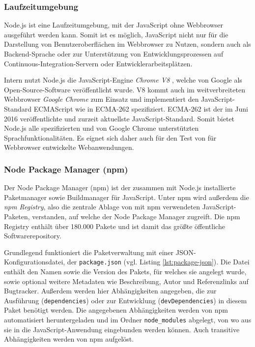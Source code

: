 \subsubsection{Laufzeitumgebung}
Node.js ist eine Laufzeitumgebung, mit der JavaScript ohne Webbrowser ausgeführt werden kann\cite[][1]{hughes2012einfuehrungnodejs}. Somit ist es möglich, JavaScript nicht nur für die Darstellung von Benutzeroberflächen im Webbrowser zu Nutzen, sondern auch als Backend-Sprache oder zur Unterstützung von Entwicklungsprozessen auf Continuous-Integration-Servern oder Entwicklerarbeitsplätzen.

Intern nutzt Node.js die JavaScript-Engine \textit{Chrome V8} \cite{nodejs}, welche von Google als Open-Source-Software veröffentlicht wurde. V8 kommt auch im weitverbreiteten Webbrowser \textit{Google Chrome} zum Einsatz und implementiert den JavaScript-Standard ECMAScript wie in ECMA-262 spezifiziert\cite{chromev8}. ECMA-262 ist der im Juni 2016 veröffentlichte und zurzeit aktuellste JavaScript-Standard\cite{ecma262}. Somit bietet Node.js alle spezifizierten und von Google Chrome unterstützten Sprachfunktionalitäten. Es eignet sich daher auch für den Test von für Webbrowser entwickelte Webanwendungen.

\subsubsection{Node Package Manager (npm)}
Der Node Package Manager (npm) ist der zusammen mit Node.js installierte Paketmanager sowie Buildmanager für JavaScript. Unter npm wird außerdem die \textit{npm Registry}, also die zentrale Ablage von mit npm verwendeten JavaScript-Paketen, verstanden, auf welche der Node Package Manager zugreift. \cite{npm-about} Die npm Registry enthält über 180.000 Pakete und ist damit das größte öffentliche Softwarerepository\cite{modulecount}.

Grundlegend funktioniert die Paketverwaltung mit einer JSON-Konfigurationsdatei, der \texttt{package.json} (vgl. Listing \ref{lst:package-json}). Die Datei enthält den Namen sowie die Version des Pakets, für welches sie angelegt wurde, sowie optional weitere Metadaten wie Beschreibung, Autor und Referenzlinks auf Bugtracker. Außerdem werden hier Abhängigkeiten angegeben, die zur Ausführung (\texttt{dependencies}) oder zur Entwicklung (\texttt{devDependencies}) in diesem Paket benötigt werden.\cite{npm-packagejson} Die angegebenen Abhängigkeiten werden von npm automatisiert heruntergeladen und im Ordner \texttt{node\_modules} abgelegt, von wo aus sie in die JavaScript-Anwendung eingebunden werden können. Auch transitive Abhängigkeiten werden von npm aufgelöst.\cite{npm-install}

